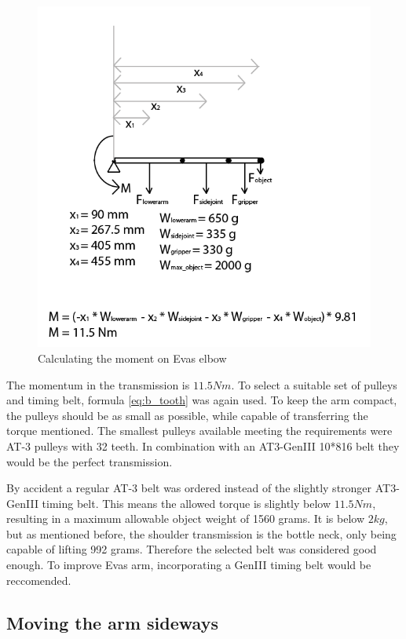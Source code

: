 \documentclass[technical_document.tex]{subfiles}
\begin{document}
\begin{figure}[ht!]
	\centering
	\mbox{\includegraphics[scale=0.7]{Images/driveTrain_elbow.png}}
	\caption{Calculating the moment on Eva\textquotesingle{}s elbow}
	\label{fig:driveTrain_elbow}
\end{figure}

The momentum in the transmission is $11.5Nm$. To select a suitable set of pulleys and timing belt, formula \ref{eq:b_tooth} was again used. To keep the arm compact, the pulleys should be as small as possible, while capable of transferring the torque mentioned. The smallest pulleys available meeting the requirements were AT-3 pulleys with 32 teeth. In combination with an AT3-GenIII 10*816 belt they would be the perfect transmission. 

By accident a regular AT-3 belt was ordered instead of the slightly stronger AT3-GenIII timing belt. This means the allowed torque is slightly below $11.5Nm$, resulting in a maximum allowable object weight  of 1560 grams. It is below $2kg$, but as mentioned before, the shoulder transmission is the bottle neck, only being capable of lifting 992 grams.
Therefore the selected belt was considered good enough. To improve Eva\textquotesingle{}s arm, incorporating a GenIII timing belt would be reccomended.

\subsection{Moving the arm sideways}
\end{document}
